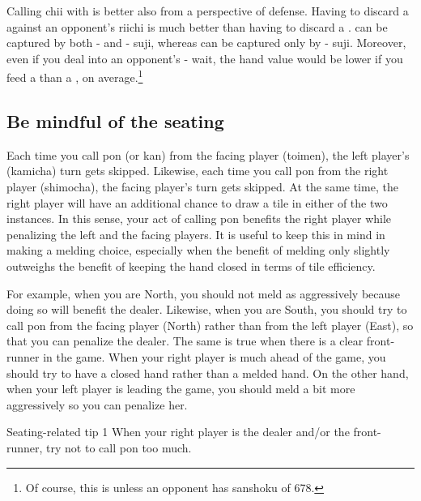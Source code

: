 \bigskip
Calling {\jap chii} with {\large{}} is better also from a perspective of defense. Having to discard a {\large{}} against an opponent's {\jap riichi} is much better than having to discard a {\large{}}. {\large{}} can be captured by both {\large{}-} and {\large{}-} {\jap suji}, whereas {\large{}} can be captured only by {\large{}-} {\jap suji}. Moreover, even if you deal into an opponent's {\large{}-} wait, the hand value would be lower if you feed a {\large{}} than a {\large{}}, on average.\footnote{Of course, this is unless an opponent has {\jap sanshoku} of 678.} 


\subsection{Be mindful of the seating}
Each time you call {\jap pon} (or {\jap kan}) from the facing player ({\jap toimen}), the left player's ({\jap kamicha}) turn gets skipped. Likewise, each time you call {\jap pon}  from the right player ({\jap shimocha}), the facing player's turn gets skipped. At the same time, the right player will have an additional chance to draw a tile in either of the two instances. In this sense, your act of calling {\jap pon} benefits the right player while penalizing the left and the facing players. 
It is useful to keep this in mind in making a melding choice, especially when the benefit of melding only slightly outweighs the benefit of keeping the hand closed in terms of tile efficiency.

\bigskip
For example, when you are North, you should not meld as aggressively because doing so will benefit the dealer. Likewise, when you are South, you should try to call {\jap pon} from the facing player (North) rather than from the left player (East), so that you can penalize the dealer. 
The same is true when there is a clear front-runner in the game. When your right player is much ahead of the game, you should try to have a closed hand rather than a melded hand. On the other hand, when your left player is leading the game, you should meld a bit more aggressively so you can penalize her. 

\begin{itembox}[c]{Seating-related tip 1}
When your right player is the dealer and/or the front-runner, try not to call {\jap pon} too much. 
\end{itembox}

